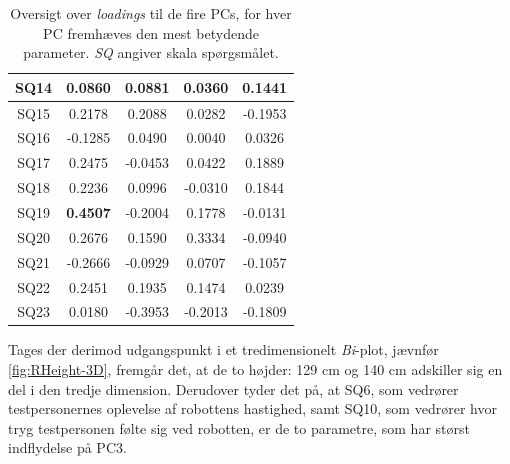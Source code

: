 \begin{table}[H]
\begin{tabular}{c|c|c|c|c}
SQ14 & 0.0860          & 0.0881          & 0.0360          & 0.1441          \\ \hline
SQ15 & 0.2178          & 0.2088          & 0.0282          & -0.1953         \\ \hline
SQ16 & -0.1285         & 0.0490          & 0.0040          & 0.0326          \\ \hline
SQ17 & 0.2475          & -0.0453         & 0.0422          & 0.1889          \\ \hline
SQ18 & 0.2236          & 0.0996          & -0.0310         & 0.1844          \\ \hline
SQ19 & \textbf{0.4507} & -0.2004         & 0.1778          & -0.0131         \\ \hline
SQ20 & 0.2676          & 0.1590          & 0.3334          & -0.0940         \\ \hline
SQ21 & -0.2666         & -0.0929         & 0.0707          & -0.1057         \\ \hline
SQ22 & 0.2451          & 0.1935          & 0.1474          & 0.0239          \\ \hline
SQ23 & 0.0180           & -0.3953        & -0.2013         & -0.1809        
\end{tabular}
\caption{Oversigt over \textit{loadings} til de fire PCs, for hver PC fremhæves den mest betydende parameter. \textit{SQ} angiver skala spørgsmålet.}
\label{tab:LoadingsHoejde}
\end{table}
\noindent
%
Tages der derimod udgangspunkt i et tredimensionelt \textit{Bi}-plot, jævnfør \autoref{fig:RHeight-3D}, fremgår det, at de to højder: 129 cm og 140 cm adskiller sig en del i den tredje dimension. Derudover tyder det på, at SQ6, som vedrører testpersonernes oplevelse af robottens hastighed, samt SQ10, som vedrører hvor tryg testpersonen følte sig ved robotten, er de to parametre, som har størst indflydelse på PC3. 


